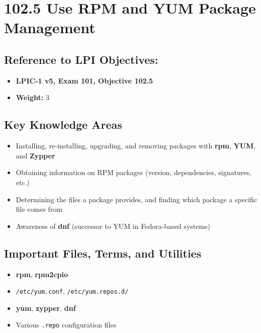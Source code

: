 \documentclass[12pt,a4paper]{report}
\begin{document}



\newpage

\section*{102.5 Use RPM and YUM Package Management}

\subsection*{Reference to LPI Objectives:}
\begin{itemize}
    \item \textbf{LPIC-1 v5, Exam 101, Objective 102.5}
    \item \textbf{Weight:} 3
\end{itemize}

\subsection*{Key Knowledge Areas}
\begin{itemize}
    \item Installing, re-installing, upgrading, and removing packages with \textbf{rpm}, \textbf{YUM}, and \textbf{Zypper}
    \item Obtaining information on RPM packages (version, dependencies, signatures, etc.)
    \item Determining the files a package provides, and finding which package a specific file comes from
    \item Awareness of \textbf{dnf} (successor to YUM in Fedora-based systems)
\end{itemize}

\subsection*{Important Files, Terms, and Utilities}
\begin{itemize}
    \item \textbf{rpm}, \textbf{rpm2cpio}
    \item \texttt{/etc/yum.conf}, \texttt{/etc/yum.repos.d/}
    \item \textbf{yum}, \textbf{zypper}, \textbf{dnf}
    \item Various \texttt{.repo} configuration files
\end{itemize}
\end{document}

